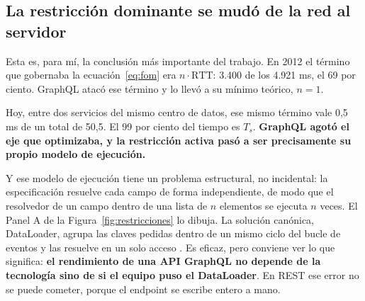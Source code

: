 \documentclass[11pt,letterpaper]{article}
\begin{document}
\subsection*{La restricción dominante se mudó de la red al servidor}

Esta es, para mí, la conclusión más importante del trabajo. En 2012 el término
que gobernaba la ecuación~\eqref{eq:fom} era $n \cdot \mathrm{RTT}$: 3.400 de
los 4.921 ms, el 69 por ciento. GraphQL atacó ese término y lo llevó a su
mínimo teórico, $n=1$.

Hoy, entre dos servicios del mismo centro de datos, ese mismo término vale
0,5 ms de un total de 50,5. El 99 por ciento del tiempo es $T_{s}$.
\textbf{GraphQL agotó el eje que optimizaba, y la restricción activa pasó a ser
precisamente su propio modelo de ejecución.}

Y ese modelo de ejecución tiene un problema estructural, no incidental: la
especificación resuelve cada campo de forma independiente, de modo que el
resolvedor de un campo dentro de una lista de $n$ elementos se ejecuta $n$
veces. El Panel A de la Figura~\ref{fig:restricciones} lo dibuja. La solución
canónica, DataLoader, agrupa las claves pedidas dentro de un mismo ciclo del
bucle de eventos y las resuelve en un solo acceso \parencite{dataloader}. Es
eficaz, pero conviene ver lo que significa: \textbf{el rendimiento de una API
GraphQL no depende de la tecnología sino de si el equipo puso el DataLoader}.
En REST ese error no se puede cometer, porque el endpoint se escribe entero a
mano.
\end{document}
